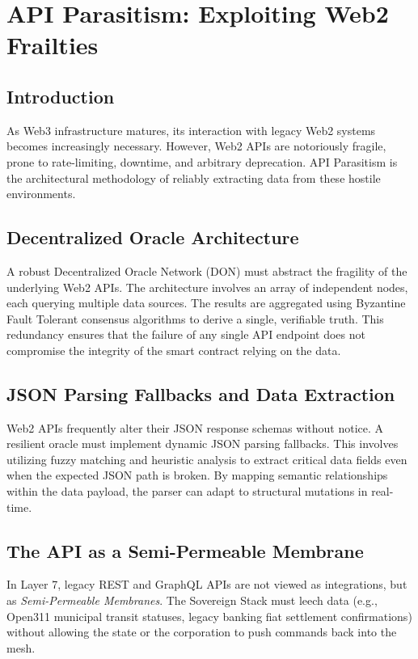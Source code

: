 \chapter{API Parasitism: Exploiting Web2 Frailties}

\section{Introduction}
As Web3 infrastructure matures, its interaction with legacy Web2 systems becomes increasingly necessary. However, Web2 APIs are notoriously fragile, prone to rate-limiting, downtime, and arbitrary deprecation. API Parasitism is the architectural methodology of reliably extracting data from these hostile environments.

\section{Decentralized Oracle Architecture}
A robust Decentralized Oracle Network (DON) must abstract the fragility of the underlying Web2 APIs. The architecture involves an array of independent nodes, each querying multiple data sources. The results are aggregated using Byzantine Fault Tolerant consensus algorithms to derive a single, verifiable truth. This redundancy ensures that the failure of any single API endpoint does not compromise the integrity of the smart contract relying on the data.

\section{JSON Parsing Fallbacks and Data Extraction}
Web2 APIs frequently alter their JSON response schemas without notice. A resilient oracle must implement dynamic JSON parsing fallbacks. This involves utilizing fuzzy matching and heuristic analysis to extract critical data fields even when the expected JSON path is broken. By mapping semantic relationships within the data payload, the parser can adapt to structural mutations in real-time.

\section{The API as a Semi-Permeable Membrane}
In Layer 7, legacy REST and GraphQL APIs are not viewed as integrations, but as \textit{Semi-Permeable Membranes}. The Sovereign Stack must leech data (e.g., Open311 municipal transit statuses, legacy banking fiat settlement confirmations) without allowing the state or the corporation to push commands back into the mesh. 


